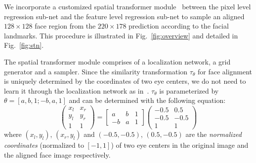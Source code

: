 \documentclass[10pt,twocolumn,letterpaper]{article}
\begin{document}



We incorporate a customized spatial transformer module~\cite{jaderberg2015spatial} between the pixel level regression sub-net and the feature level regression sub-net to sample an aligned $128 \times 128$ face region from the $220 \times 178$ prediction according to the facial landmarks. This procedure is illustrated in Fig.~\ref{fig:overview} and detailed in Fig.~\ref{fig:stn}.


The spatial transformer module comprises of a localization network, a grid generator and a sampler. Since the similarity transformation $\tau_\theta$ for face alignment is uniquely determined by the coordinates of two eye centers, we do not need to learn it through the localization network as in~\cite{jaderberg2015spatial}. $\tau_\theta$ is parameterized by $\theta = [a,b,1;-b,a,1]$ and can be determined with the following equation:
\begin{equation}
\left( {\begin{array}{*{20}{c}}
x_l&x_r\\
y_l&y_r\\
1&1
\end{array}} \right) = \left[{\begin{array}{*{20}{c}}
a&b&1\\
{ - b}&a&1
\end{array}} \right]\left({\begin{array}{*{20}{c}}
{ - 0.5}&{0.5}\\
{ - 0.5}&{ - 0.5}\\
1&1
\end{array}} \right)
\end{equation}
where $(x_l,y_l)$, $(x_r,y_l)$ and $(-0.5,-0.5)$, $(0.5,-0.5)$ are the \textit{normalized coordinates} (normalized to $[-1,1]$) of two eye centers in the original image and the aligned face image respectively.
\end{document}
